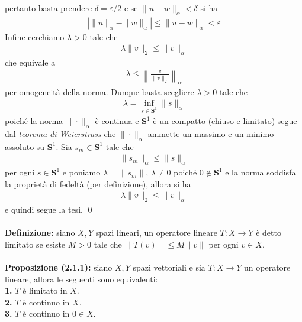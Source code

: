 \documentclass{article}
\numberwithin{equation}{subsection}
\begin{document}
pertanto basta prendere $\delta = \varepsilon/2$ e se $\|u - w\|_\alpha < \delta$ si ha
\begin{align*}
    |\|u\|_\alpha - \|w\|_\alpha| \leq \|u - w\|_\alpha < \varepsilon 
\end{align*}
Infine cerchiamo $\lambda > 0$ tale che
\begin{align*}
    \lambda\|v\|_2 \leq \|v\|_\alpha 
\end{align*}
che equivale a
\begin{align*}
    \lambda \leq \left\|\frac{v}{\|v\|_2}\right\|_\alpha 
\end{align*}
per omogeneità della norma. Dunque basta scegliere $\lambda > 0$ tale che
\begin{gather*}
    \lambda = \inf_{s \in \mathbf{S}^1}\|s\|_\alpha 
\end{gather*}
poiché la norma $\|\cdot\|_\alpha$ è continua e $\mathbf{S}^1$ è un compatto (chiuso e limitato) segue dal \textit{teorema di Weierstrass} che $\|\cdot\|_\alpha$ ammette un massimo e un minimo assoluto su $\mathbf{S}^1$. Sia $s_m \in \mathbf{S}^1$ tale che
\begin{align*}
    \|s_m\|_\alpha \leq \|s\|_\alpha 
\end{align*}
per ogni $s \in \mathbf{S}^1$ e poniamo $\lambda = \|s_m\|$, $\lambda \neq 0$ poiché $0 \not\in \mathbf{S}^1$ e la norma soddisfa la proprietà di fedeltà (per definizione), allora si ha
\begin{gather*}
    \lambda\|v\|_2 \leq \|v\|_\alpha 
\end{gather*}
e quindi segue la tesi. \qed \\ \\
\textbf{Definizione:} siano $X, Y$ spazi lineari, un operatore lineare $T : X \longrightarrow Y$ è detto limitato se esiste $M > 0$ tale che $\|T(v)\| \leq M\|v\|$ per ogni $v \in X$. \\ \\
\textbf{Proposizione (2.1.1):} siano $X, Y$ spazi vettoriali e sia $T : X \longrightarrow Y$ un operatore lineare, allora le seguenti sono equivalenti: \\
\textbf{1.} $T$ è limitato in $X$. \\
\textbf{2.} $T$ è continuo in $X$. \\
\textbf{3.} $T$ è continuo in $0 \in X$. \\
\end{document}
